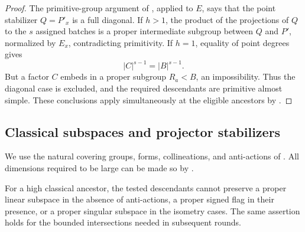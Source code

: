 \begin{proof}
The primitive-group argument of , applied to \(E\), says that the point
stabilizer \(Q=P'_x\) is a full diagonal.  If \(h>1\), the product of the projections of \(Q\) to the
\(s\) assigned batches is a proper intermediate subgroup between \(Q\) and \(P'\), normalized by \(E_x\),
contradicting primitivity.  If \(h=1\), equality of point degrees gives
\[
 |C|^{s-1}=|B|^{s-1}.
\]
But a factor \(C\) embeds in a proper subgroup \(R_a<B\), an impossibility.  Thus the diagonal case is
excluded, and the required descendants are primitive almost simple.  These conclusions apply
simultaneously at the eligible ancestors by .

\end{proof}

\subsection{Classical subspaces and projector stabilizers}
\label{fa:classical-initial}
We use the natural covering groups, forms, collineations, and anti-actions of .  All
dimensions required to be large can be made so by .

\begin{lemma}\label{fa:parabolic-exclusion}
For a high classical ancestor, the tested descendants cannot preserve a proper linear subspace in the
absence of anti-actions, a proper signed flag in their presence, or a proper singular subspace in the
isometry cases.  The same assertion holds for the bounded intersections needed in subsequent rounds.
\end{lemma}


